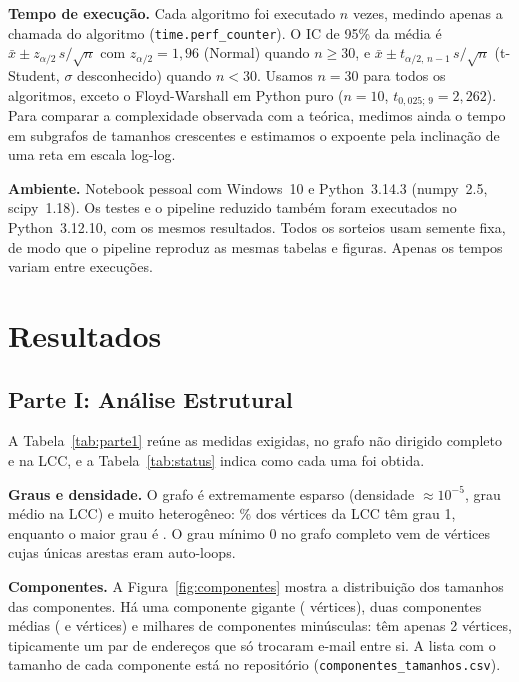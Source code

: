 \documentclass[sigconf]{webmedia}
\begin{document}
\textbf{Tempo de execução.} Cada algoritmo foi executado $n$ vezes, medindo apenas a
chamada do algoritmo (\texttt{time.perf\_counter}). O IC de 95\% da média é
$\bar{x} \pm z_{\alpha/2}\, s/\sqrt{n}$ com $z_{\alpha/2}=1{,}96$ (Normal) quando $n \ge 30$,
e $\bar{x} \pm t_{\alpha/2,\,n-1}\, s/\sqrt{n}$ (t-Student, $\sigma$ desconhecido) quando
$n<30$. Usamos $n=30$ para todos os algoritmos, exceto o Floyd-Warshall em Python puro
($n=10$, $t_{0{,}025;\,9} = 2{,}262$). Para comparar a complexidade observada com a
teórica, medimos ainda o tempo em subgrafos de tamanhos crescentes e estimamos o
expoente pela inclinação de uma reta em escala log-log.

\textbf{Ambiente.} Notebook pessoal com Windows~10 e Python~3.14.3 (numpy~2.5,
scipy~1.18). Os testes e o pipeline reduzido também foram executados no Python~3.12.10,
com os mesmos resultados. Todos os sorteios usam semente fixa, de modo que o pipeline reproduz as
mesmas tabelas e figuras. Apenas os tempos variam entre execuções.

\section{Resultados}
\label{sec:resultados}

\subsection{Parte I: Análise Estrutural}

A Tabela~\ref{tab:parte1} reúne as medidas exigidas, no grafo não dirigido completo e na
LCC, e a Tabela~\ref{tab:status} indica como cada uma foi obtida.





\textbf{Graus e densidade.} O grafo é extremamente esparso (densidade
$\approx10^{-5}$, grau médio \grauMedioLcc{} na LCC) e muito heterogêneo: \pctFolhas\% dos vértices da
LCC têm grau 1, enquanto o maior grau é \grauMax. O grau mínimo 0 no grafo completo vem de
\nIsolados{} vértices cujas únicas arestas eram auto-loops.

\textbf{Componentes.} A Figura~\ref{fig:componentes} mostra a distribuição dos tamanhos
das \nComp{} componentes. Há uma componente gigante (\nVLcc{} vértices), duas componentes
médias (\compSegunda{} e \compTerceira{} vértices) e milhares de componentes minúsculas: \compPares{} têm apenas
2 vértices, tipicamente um par de endereços que só trocaram e-mail entre si. A lista com
o tamanho de cada componente está no repositório
(\texttt{componentes\_tamanhos.csv}).
\end{document}
